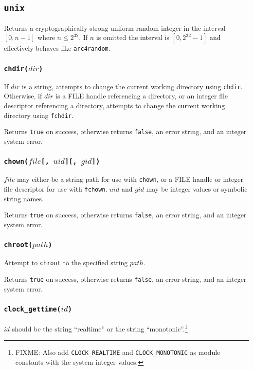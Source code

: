 \documentclass[11pt, oneside]{memoir}
\newcommand*{\true}[0]{\texttt{true}\xspace}
\newcommand*{\false}[0]{\texttt{false}\xspace}
\newcommand*{\syscall}[1]{\texttt{#1}\xspace}
\newcommand*{\fn}[1]{\texttt{#1}\xspace}
\newcounter{toccols}
\newenvironment{Module}[1]{
	\subsection{\texttt{#1}}
	\addtocontents{toc}{
		\protect\begin{multicols}{\value{toccols}}
	}
}{
	\addtocontents{toc}{\protect\end{multicols}}
}
\begin{document}
\begin{Module}{unix}
Returns a cryptographically strong uniform random integer in the interval $[0, n-1]$ where $n \leq 2^{32}$. If $n$ is omitted the interval is $[0, 2^{32}-1]$ and effectively behaves like \fn{arc4random}.

\subsubsection[\fn{chdir}]{\fn{chdir($dir$)}}

If $dir$ is a string, attempts to change the current working directory using \syscall{chdir}. Otherwise, if $dir$ is a FILE handle referencing a directory, or an integer file descriptor referencing a directory, attempts to change the current working directory using \syscall{fchdir}.

Returns \true on success, otherwise returns \false, an error string, and an integer system error.

\subsubsection[\fn{chown}]{\fn{chown($file$[, $uid$][, $gid$])}}

$file$ may either be a string path for use with \syscall{chown}, or a FILE handle or integer file descriptor for use with \syscall{fchown}. $uid$ and $gid$ may be integer values or symbolic string names.

Returns \true on success, otherwise returns \false, an error string, and an integer system error.

\subsubsection[\fn{chroot}]{\fn{chroot($path$)}}

Attempt to \syscall{chroot} to the specified string $path$.

Returns \true on success, otherwise returns \false, an error string, and an integer system error.

\subsubsection[\fn{clock\_gettime}]{\fn{clock\_gettime($id$)}}

$id$ should be the string ``realtime'' or the string ``monotonic''.\footnote{FIXME: Also add \texttt{CLOCK\_REALTIME} and \texttt{CLOCK\_MONOTONIC} as module constants with the system integer values.}


\end{Module}
\end{document}
